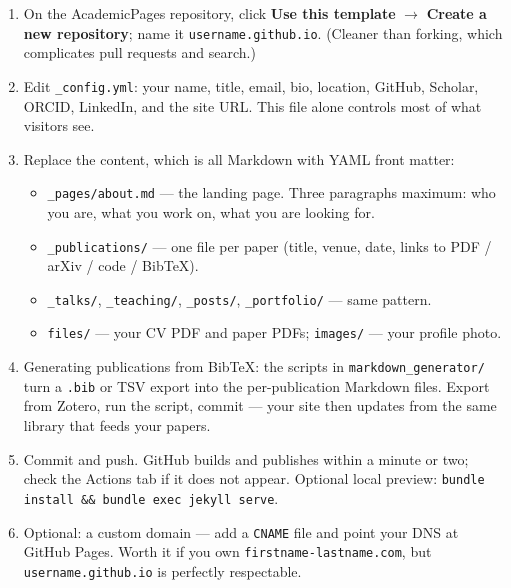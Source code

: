 \documentclass[11pt,a4paper]{article}
\newcommand{\code}[1]{\texttt{\small #1}}
\begin{document}
\begin{enumerate}
  \item On the AcademicPages repository, click \textbf{Use this template}
        $\rightarrow$ \textbf{Create a new repository}; name it
        \code{username.github.io}. (Cleaner than forking, which complicates
        pull requests and search.)
  \item Edit \code{\_config.yml}: your name, title, email, bio, location,
        GitHub, Scholar, ORCID, LinkedIn, and the site URL. This file alone
        controls most of what visitors see.
  \item Replace the content, which is all Markdown with YAML front matter:
        \begin{itemize}
          \item \code{\_pages/about.md} --- the landing page. Three paragraphs
                maximum: who you are, what you work on, what you are looking
                for.
          \item \code{\_publications/} --- one file per paper (title, venue,
                date, links to PDF / arXiv / code / BibTeX).
          \item \code{\_talks/}, \code{\_teaching/}, \code{\_posts/},
                \code{\_portfolio/} --- same pattern.
          \item \code{files/} --- your CV PDF and paper PDFs;
                \code{images/} --- your profile photo.
        \end{itemize}
  \item Generating publications from BibTeX: the scripts in
        \code{markdown\_generator/} turn a \code{.bib} or TSV export into the
        per-publication Markdown files. Export from Zotero, run the script,
        commit --- your site then updates from the same library that feeds
        your papers.
  \item Commit and push. GitHub builds and publishes within a minute or two;
        check the Actions tab if it does not appear. Optional local preview:
        \code{bundle install \&\& bundle exec jekyll serve}.
  \item Optional: a custom domain --- add a \code{CNAME} file and point your
        DNS at GitHub Pages. Worth it if you own \code{firstname-lastname.com},
        but \code{username.github.io} is perfectly respectable.
\end{enumerate}
\end{document}
